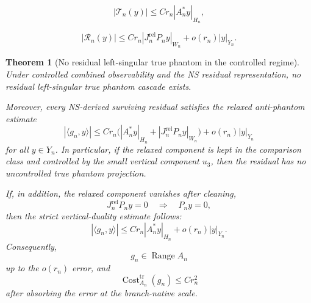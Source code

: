 \documentclass[10pt,a4paper]{amsart}
\newtheorem{theorem}{Theorem}
\begin{document}
\begin{equation}
|\mathcal T_n(y)|
\le
C r_n|A_n^*y|_{H_n},
\label{eq:tag-10-248}
\end{equation}

\begin{equation}
|\mathcal R_n(y)|
\le
C r_n|J_n^{\mathrm{rel}}P_n y|_{W_n}
+
o(r_n)|y|_{Y_n}.
\label{eq:tag-10-249}
\end{equation}

\begin{theorem}[No residual left-singular true phantom in the controlled regime]
Under controlled combined observability and the NS residual representation, no residual left-singular true phantom cascade exists.

Moreover, every NS-derived surviving residual satisfies the relaxed anti-phantom estimate
\begin{equation}
|\langle g_n,y\rangle|
\le
C r_n
\Big(
|A_n^*y|_{H_n}
+
|J_n^{\mathrm{rel}}P_n y|_{W_n}
\Big)
+
o(r_n)|y|_{Y_n}
\label{eq:tag-10-253}
\end{equation}
for all \(y\in Y_n\). In particular, if the relaxed component is kept in the comparison class and controlled by the small vertical component \(u_3\), then the residual has no uncontrolled true phantom projection.

If, in addition, the relaxed component vanishes after cleaning,
\begin{equation}
J_n^{\mathrm{rel}}P_n y=0
\quad\Longrightarrow\quad
P_ny=0,
\label{eq:tag-10-254}
\end{equation}
then the strict vertical-duality estimate follows:
\begin{equation}
|\langle g_n,y\rangle|
\le
C r_n|A_n^*y|_{H_n}
+
o(r_n)|y|_{Y_n}.
\label{eq:tag-10-255}
\end{equation}
Consequently,
\[
g_n\in \operatorname{Range}A_n
\]
up to the \(o(r_n)\) error, and
\begin{equation}
\operatorname{Cost}^{\operatorname{tr}}_{A_n}(g_n)
\le
C r_n^2
\label{eq:tag-10-256}
\end{equation}
after absorbing the error at the branch-native scale.
\end{theorem}
\end{document}
